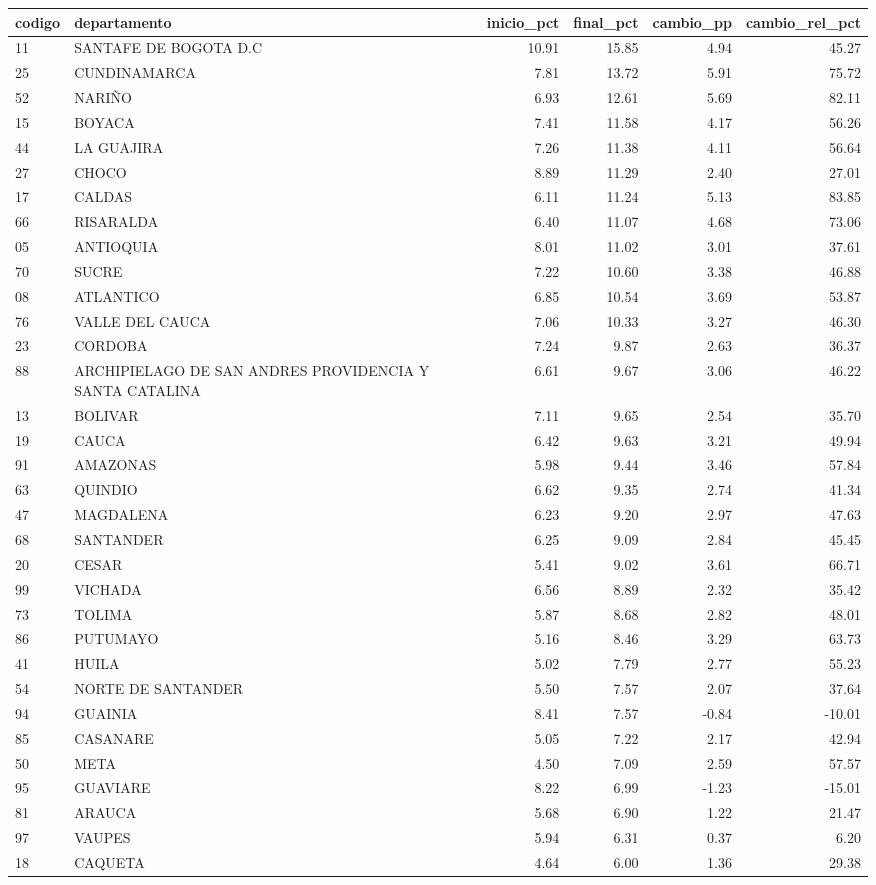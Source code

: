 \begin{tabular}{llrrrr}
\toprule
codigo & departamento & inicio\_pct & final\_pct & cambio\_pp & cambio\_rel\_pct \\
\midrule
11 & SANTAFE DE BOGOTA D.C & 10.91 & 15.85 & 4.94 & 45.27 \\
25 & CUNDINAMARCA & 7.81 & 13.72 & 5.91 & 75.72 \\
52 & NARIÑO & 6.93 & 12.61 & 5.69 & 82.11 \\
15 & BOYACA & 7.41 & 11.58 & 4.17 & 56.26 \\
44 & LA GUAJIRA & 7.26 & 11.38 & 4.11 & 56.64 \\
27 & CHOCO & 8.89 & 11.29 & 2.40 & 27.01 \\
17 & CALDAS & 6.11 & 11.24 & 5.13 & 83.85 \\
66 & RISARALDA & 6.40 & 11.07 & 4.68 & 73.06 \\
05 & ANTIOQUIA & 8.01 & 11.02 & 3.01 & 37.61 \\
70 & SUCRE & 7.22 & 10.60 & 3.38 & 46.88 \\
08 & ATLANTICO & 6.85 & 10.54 & 3.69 & 53.87 \\
76 & VALLE DEL CAUCA & 7.06 & 10.33 & 3.27 & 46.30 \\
23 & CORDOBA & 7.24 & 9.87 & 2.63 & 36.37 \\
88 & ARCHIPIELAGO DE SAN ANDRES PROVIDENCIA Y SANTA CATALINA & 6.61 & 9.67 & 3.06 & 46.22 \\
13 & BOLIVAR & 7.11 & 9.65 & 2.54 & 35.70 \\
19 & CAUCA & 6.42 & 9.63 & 3.21 & 49.94 \\
91 & AMAZONAS & 5.98 & 9.44 & 3.46 & 57.84 \\
63 & QUINDIO & 6.62 & 9.35 & 2.74 & 41.34 \\
47 & MAGDALENA & 6.23 & 9.20 & 2.97 & 47.63 \\
68 & SANTANDER & 6.25 & 9.09 & 2.84 & 45.45 \\
20 & CESAR & 5.41 & 9.02 & 3.61 & 66.71 \\
99 & VICHADA & 6.56 & 8.89 & 2.32 & 35.42 \\
73 & TOLIMA & 5.87 & 8.68 & 2.82 & 48.01 \\
86 & PUTUMAYO & 5.16 & 8.46 & 3.29 & 63.73 \\
41 & HUILA & 5.02 & 7.79 & 2.77 & 55.23 \\
54 & NORTE DE SANTANDER & 5.50 & 7.57 & 2.07 & 37.64 \\
94 & GUAINIA & 8.41 & 7.57 & -0.84 & -10.01 \\
85 & CASANARE & 5.05 & 7.22 & 2.17 & 42.94 \\
50 & META & 4.50 & 7.09 & 2.59 & 57.57 \\
95 & GUAVIARE & 8.22 & 6.99 & -1.23 & -15.01 \\
81 & ARAUCA & 5.68 & 6.90 & 1.22 & 21.47 \\
97 & VAUPES & 5.94 & 6.31 & 0.37 & 6.20 \\
18 & CAQUETA & 4.64 & 6.00 & 1.36 & 29.38 \\
\bottomrule
\end{tabular}
